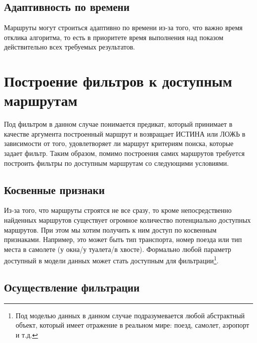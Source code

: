 \subsection{Адаптивность по времени}
Маршруты могут строиться адаптивно по времени из-за того, что важно время отклика алгоритма, то есть в приоритете время выполнения над показом действительно всех требуемых результатов.

\section{Построение фильтров к доступным маршрутам}
Под фильтром в данном случае понимается предикат, который принимает в качестве аргумента построенный маршрут и возвращает ИСТИНА или ЛОЖЬ в зависимости от того, удовлетворяет ли маршрут критериям поиска, которые задает фильтр.
Таким образом, помимо построения самих маршрутов требуется построить фильтры по доступным маршрутам со следующими условиями.

\subsection{Косвенные признаки}
Из-за того, что маршруты строятся не все сразу, то кроме непосредственно найденных маршрутов существует огромное количество потенциально доступных маршрутов. При этом мы хотим получить к ним доступ по косвенным признаками. Например, это может быть тип транспорта, номер поезда или тип места в самолете (у окна/у туалета/в хвосте). Формально любой параметр доступный в модели данных может стать доступным для фильтрации\footnote{Под моделью данных в данном случае подразумевается любой абстрактный объект, который имеет отражение в реальном мире: поезд, самолет, аэропорт и т.д.}.

\subsection{Осуществление фильтрации}


